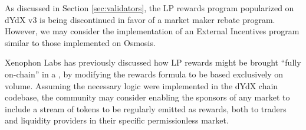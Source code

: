             
            As discussed in Section \ref{sec:validators}, the LP rewards program popularized on dYdX v3 is being discontinued in favor of a market maker rebate program. However, we may consider the implementation of an External Incentives program similar to those implemented on Osmosis. 
            
            Xenophon Labs has previously discussed how LP rewards might be brought ``fully on-chain'' in a , by modifying the rewards formula to be based exclusively on volume. Assuming the necessary logic were implemented in the dYdX chain codebase, the community may consider enabling the sponsors of any market to include a stream of tokens to be regularly emitted as rewards, both to traders and liquidity providers in their specific permissionless market.

